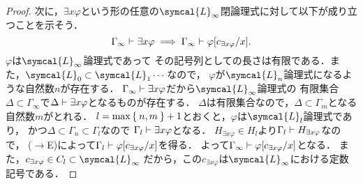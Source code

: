 \begin{proof}
	次に，\(\exists x \varphi\)という形の任意の\(\symcal{L}_\infty\)閉論理式に対して以下が成り立つことを示そう．
	\begin{equation}
		\Gamma_\infty \provable \exists x \varphi
		\metaimplies \text{\(\Gamma_\infty \provable \subst{\varphi}{c_{\exists x \varphi}/x}\)}.
		\label{eq:henkincondition}
	\end{equation}
	\(\varphi\)は\(\symcal{L}_\infty\)論理式であって
	その記号列としての長さは有限である．また，\(\symcal{L}_0 \subset \symcal{L}_1 \dotsb\)なので，
	\(\varphi\)が\(\symcal{L}_n\)論理式になるような自然数\(n\)が存在する．
	\(\Gamma_\infty \vdash \exists x \varphi\)だから\(\symcal{L}_\infty\)論理式の
	有限集合\(\Delta \subset \Gamma_\infty\)で\(\Delta \vdash \exists x \varphi\)となるものが存在する．
	\(\Delta\)は有限集合なので，\(\Delta \subset \Gamma_m\)となる自然数\(m\)がとれる．
	\(l = \max \Set{n, m} + 1\)とおくと，\(\varphi\)は\(\symcal{L}_l\)論理式であり，
	かつ\(\Delta \subset \Gamma_n \subset \Gamma_l\)なので
	\(\Gamma_l \vdash \exists x \varphi\)となる．
	\(H_{\exists x \varphi} \in H_l\)より\(\Gamma_l \vdash H_{\exists x \varphi}\)なので，
	(\(\to\)E)によって\(\Gamma_l \provable \subst{\varphi}{c_{\exists x \varphi}/x}\)を得る．
	よって\(\Gamma_\infty \provable \subst{\varphi}{c_{\exists x \varphi}/x}\)となる．
	また，\(c_{\exists x \varphi} \in C_l \subset \symcal{L}_\infty\)
	だから，この\(c_{\exists x \varphi}\)は\(\symcal{L}_\infty\)における定数記号である．
\end{proof}


